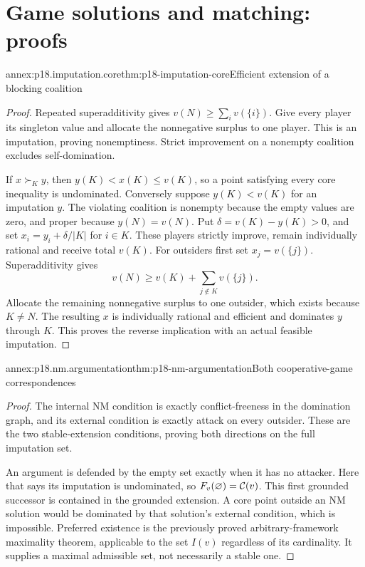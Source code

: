 \section{Game solutions and matching: proofs}
\label{sec:annex-p18-game-argumentation}

\begin{annexitem}{annex:p18.imputation.core}{thm:p18-imputation-core}{Efficient extension of a blocking coalition}
\begin{proof}
Repeated superadditivity gives
\(v(N)\geq\sum_i v(\{i\})\). Give every player its
singleton value and allocate the nonnegative surplus
to one player. This is an imputation, proving
nonemptiness. Strict improvement on a nonempty
coalition excludes self-domination.

If \(x\succ_K y\), then \(y(K)<x(K)\leq v(K)\),
so a point satisfying every core inequality is
undominated. Conversely suppose \(y(K)<v(K)\)
for an imputation \(y\). The violating coalition
is nonempty because the empty values are zero,
and proper because \(y(N)=v(N)\).
Put \(\delta=v(K)-y(K)>0\), and set
\(x_i=y_i+\delta/|K|\) for \(i\in K\).
These players strictly improve, remain individually
rational and receive total \(v(K)\).
For outsiders first set \(x_j=v(\{j\})\).
Superadditivity gives
\[
                    v(N)\geq v(K)+\sum_{j\notin K}v(\{j\}).
\]
Allocate the remaining nonnegative surplus to
one outsider, which exists because \(K\ne N\).
The resulting \(x\) is individually rational
and efficient and dominates \(y\) through \(K\).
This proves the reverse implication with an
actual feasible imputation.
\end{proof}
\end{annexitem}

\begin{annexitem}{annex:p18.nm.argumentation}{thm:p18-nm-argumentation}{Both cooperative-game correspondences}
\begin{proof}
The internal NM condition is exactly conflict-freeness
in the domination graph, and its external condition
is exactly attack on every outsider. These are
the two stable-extension conditions, proving both
directions on the full imputation set.

An argument is defended by the empty set exactly
when it has no attacker. Here that says its
imputation is undominated, so
\(F_v(\varnothing)={\cal C}(v)\).
This first grounded successor is contained
in the grounded extension. A core point
outside an NM solution would be dominated
by that solution's external condition,
which is impossible. Preferred existence
is the previously proved arbitrary-framework
maximality theorem, applicable to the set
\(I(v)\) regardless of its cardinality.
It supplies a maximal admissible set,
not necessarily a stable one.
\end{proof}
\end{annexitem}

